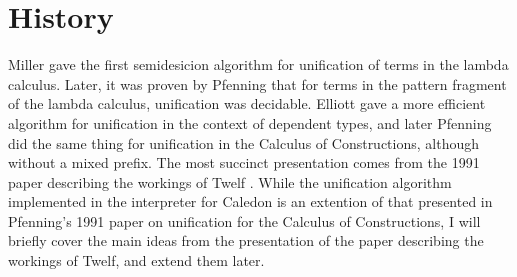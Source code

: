 \section{History}

Miller \citep{miller1986higher} gave the first semidesicion algorithm for unification of 
terms in the lambda calculus.  
Later, it was proven by Pfenning \citep{pfenning1988partial} \citep{pfenning1988higher} 
that for terms in the pattern fragment of the lambda calculus, unification was decidable.  
Elliott\citep{elliott1989higher} gave a more efficient algorithm for unification in the context 
of dependent types, and later Pfenning \citep{pfenning1991unification}
did the same thing for unification in the Calculus of Constructions, although without a mixed prefix.  
The most succinct presentation comes from the 1991 paper describing the workings of Twelf 
\citep{pfenning1991logic}.  While the unification algorithm implemented in the interpreter for Caledon is 
an extention of that presented in Pfenning's 1991 paper on unification for 
the Calculus of Constructions\citep{pfenning1991unification}, 
I will briefly cover the main ideas from the presentation of the paper describing the workings of Twelf, 
and extend them later.